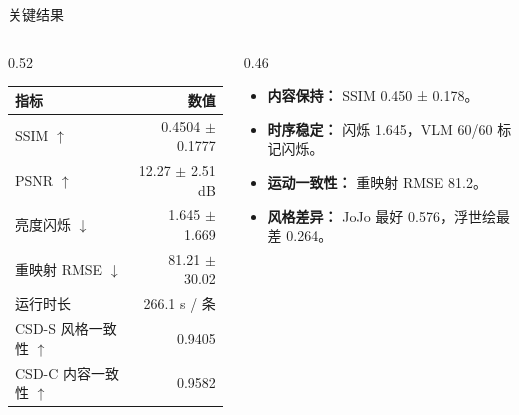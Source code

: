 \documentclass[aspectratio=169,11pt]{beamer}
\newcommand{\headrow}[1]{\color{white}\bfseries #1}
\begin{document}
\begin{frame}{关键结果}
\begin{columns}[T]
\begin{column}{0.52\textwidth}
\small
\begin{tabular}{lr}
\toprule
\rowcolor{navy}\headrow{指标} & \headrow{数值} \\
\midrule
SSIM $\uparrow$ & 0.4504 $\pm$ 0.1777 \\
PSNR $\uparrow$ & 12.27 $\pm$ 2.51 dB \\
亮度闪烁 $\downarrow$ & 1.645 $\pm$ 1.669 \\
重映射 RMSE $\downarrow$ & 81.21 $\pm$ 30.02 \\
运行时长 & 266.1 s / 条 \\
CSD-S 风格一致性 $\uparrow$ & 0.9405 \\
CSD-C 内容一致性 $\uparrow$ & 0.9582 \\

\bottomrule
\end{tabular}
\end{column}
\begin{column}{0.46\textwidth}
\small
\begin{itemize}
\item \textbf{内容保持：} SSIM 0.450 ± 0.178。
\item \textbf{时序稳定：} 闪烁 1.645，VLM 60/60 标记闪烁。
\item \textbf{运动一致性：} 重映射 RMSE 81.2。
\item \textbf{风格差异：} JoJo 最好 0.576，浮世绘最差 0.264。
\end{itemize}
\end{column}
\end{columns}
\end{frame}
\end{document}
